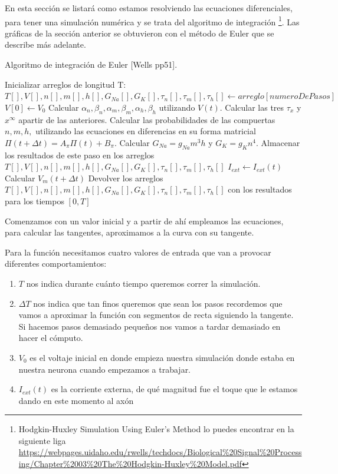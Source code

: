 En esta sección se listará como estamos resolviendo las ecuaciones diferenciales, para tener una simulación numérica y se trata del algoritmo de integración \footnote{Hodgkin-Huxley Simulation Using Euler's Method lo puedes encontrar en la siguiente liga \url{https://webpages.uidaho.edu/rwells/techdocs/Biological\%20Signal\%20Processing/Chapter\%2003\%20The\%20Hodgkin-Huxley\%20Model.pdf}}. Las gráficas de la sección anterior se obtuvieron con el método de Euler que se describe más adelante.

\begin{algorithm}
  \caption{Algoritmo de integración de Euler [Wells pp51].}\label{AIE}
  \begin{algorithmic}[1]
    \State Inicializar arreglos de longitud T: $T[],V[],n[],m[],h[],G_{Na}[],G_{K}[],\tau_{n}[],\tau_{m}[],\tau_{h}[] \gets arreglo[numeroDePasos] $
    \State  $V[0] \gets V_{0}$
        \State Calcular $\alpha_{n}, \beta_{n}, \alpha_{m}, \beta_{m},\alpha_{h}, \beta_{h} $ utilizando $V(t)$.
        \State Calcular las tres $\tau_{x} $ y $x^\infty $ apartir de las anteriores.
        \State Calcular las probabilidades de las compuertas $n, m, h, $ utilizando las ecuaciones en diferencias en su forma matricial $\Pi(t + \Delta t) = A_{\pi}\Pi(t) + B_{\pi}$.
        \State Calcular $G_{Na} = g_{Na}m^3h $ y $G_{K} = g_{K}n^4 $.
        \State Almacenar los resultados de este paso en los arreglos $T[], V[], n[], m[], h[], G_{Na}[], G_{K}[], \tau_{n}[], \tau_{m}[], \tau_{h}[] $
        \State $I_{ext} \gets I_{ext}(t) $
        \State Calcular $V_{m} (t + \Delta t) $
    \EndFor
    \State Devolver los arreglos $T[],V[],n[],m[],h[],G_{Na}[],G_{K}[],\tau_{n}[],\tau_{m}[],\tau_{h}[] $ con los resultados para los tiempos $[0,T] $
    \EndFunction
  \end{algorithmic}
\end{algorithm}


Comenzamos con un valor inicial y a partir de ahí empleamos las ecuaciones, para calcular las tangentes, aproximamos a la curva con su tangente.

Para la función  necesitamos cuatro valores de entrada que van a provocar diferentes comportamientos:

\begin{enumerate}
 \item $T$ nos indica durante cuánto tiempo queremos correr la simulación.
 \item $\Delta T $ nos indica que tan finos queremos que sean los pasos recordemos que vamos a aproximar la función con segmentos de recta siguiendo la tangente. Si hacemos pasos demasiado pequeños nos vamos a tardar demasiado en hacer el cómputo.
 \item $V_{0} $ es el voltaje inicial en donde empieza nuestra simulación donde estaba en nuestra neurona cuando empezamos a trabajar.
 \item $I_{ext}(t) $ es la corriente externa, de qué magnitud fue el toque que le estamos dando en este momento al axón 

\end{enumerate}

